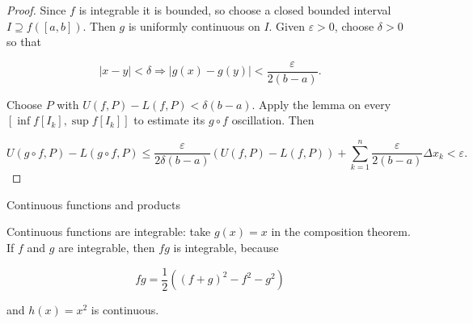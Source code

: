\begin{proof}

Since \(f\) is integrable it is bounded, so choose a closed bounded interval \(I \supseteq f\left( \left\lbrack {a,b} \right\rbrack \right)\). Then \(g\) is uniformly continuous on \(I\). Given \(\varepsilon > 0\), choose \(\delta > 0\) so that

\[\left| {x - y} \right| < \delta\Rightarrow\left| {g(x) - g(y)} \right| < \frac{\varepsilon}{2\left( {b - a} \right)}.\]

Choose \(P\) with \(U\left( {f,P} \right) - L\left( {f,P} \right) < \delta\left( {b - a} \right)\). Apply the lemma on every \(\left\lbrack {\inf f\left\lbrack I_{k} \right\rbrack,\sup f\left\lbrack I_{k} \right\rbrack} \right\rbrack\) to estimate its \(g \circ f\) oscillation. Then

\[U\left( {g \circ f,P} \right) - L\left( {g \circ f,P} \right) \leq \frac{\varepsilon}{2\delta\left( {b - a} \right)}\left( {U\left( {f,P} \right) - L\left( {f,P} \right)} \right) + \sum\limits_{k = 1}^{n}\frac{\varepsilon}{2\left( {b - a} \right)}\Delta x_{k} < \varepsilon.\]

\end{proof}

\begin{corollary}{Continuous functions and products}

Continuous functions are integrable: take \(g(x) = x\) in the composition theorem. If \(f\) and \(g\) are integrable, then \(fg\) is integrable, because

\[fg = \frac{1}{2}\left( {\left( {f + g} \right)^{2} - f^{2} - g^{2}} \right)\]

and \(h(x) = x^{2}\) is continuous.

\end{corollary}

